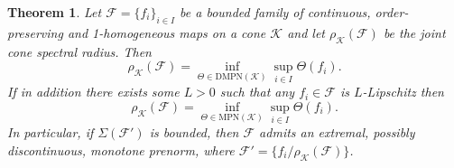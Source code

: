\documentclass{article}
\newtheorem{theorem}{Theorem}[section]
\newcommand{\family}{\mathcal{F}}
\newcommand{\cradius}{\rho_{\cone}}
\newcommand{\MPN}{\mathrm{MPN}}
\newcommand{\DMPN}{\mathrm{DMPN}}
\newcommand{\cone}{\mathcal{K}}
\begin{document}
%
%
\begin{theorem}\label{Thm_duality_for_the_cone_spectral_radius}
    Let $\family=\{f_i\}_{i\in I}$ be a bounded family of continuous, order-preserving and 1-homogeneous maps on a cone $\cone$ and let $\cradius(\family)$ be the joint cone spectral radius. Then 
    \begin{equation}
        \cradius(\family)=\inf_{\Theta\in \DMPN(\cone)}\sup_{i\in I}\Theta(f_i).
    \end{equation}
    If in addition there exists some $L>0$ such that any $f_i\in \family$ is $L$-Lipschitz then
    \begin{equation}
        \cradius(\family)=\inf_{\Theta\in \MPN(\cone)}\sup_{i\in I}\Theta(f_i).
    \end{equation}
    In particular, if $\Sigma(\family')$ is bounded, then $\family$ admits an extremal, possibly discontinuous, monotone prenorm, where $\family'=\{f_i/\cradius(\family)\}$.   
\end{theorem}
\end{document}
